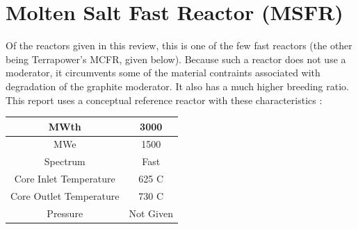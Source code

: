 \documentclass[letterpaper]{article}
\begin{document}
\section{Molten Salt Fast Reactor (MSFR)}
Of the reactors given in this review, this is one of the few fast reactors (the other being Terrapower's MCFR, given below).  Because such a reactor does not use a moderator, it circumvents some of the material contraints associated with degradation of the graphite moderator.  It also has a much higher breeding ratio.  This report uses a conceptual reference reactor with these characteristics \cite{rouch_preliminary_2014}: 

\begin{center}
\begin{tabular}{|c|c|}
\hline
MWth & 3000 \\
\hline
MWe & 1500 \\
\hline
Spectrum & Fast \\
\hline
Core Inlet Temperature & 625 C \\
\hline
Core Outlet Temperature & 730 C \\
\hline
Pressure & Not Given \\
\hline
\end{tabular}
\end{center}
\end{document}
